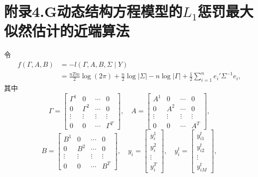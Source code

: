 \section*{附录4.G\quad 动态结构方程模型的\texorpdfstring{$L_1$}{L1}惩罚最大似然估计的近端算法}

令
\begin{equation}
\begin{aligned}
f(\Gamma,A,B)&=-l(\Gamma,A,B,\Sigma\mid Y)\\
&=\frac{nTm}{2}\log(2\pi)+\frac n2\log|\Sigma|-n\log|\Gamma|
+\frac12\sum_{i=1}^{n}e_i'\Sigma^{-1}e_i,
\end{aligned}\tag{4.G.1}
\end{equation}
其中
\[
\Gamma=\begin{bmatrix}\Gamma^1&0&\cdots&0\\0&\Gamma^2&\cdots&0\\\vdots&\vdots&\vdots&\vdots\\0&0&\cdots&\Gamma^T\end{bmatrix},\quad
A=\begin{bmatrix}A^1&0&\cdots&0\\0&A^2&\cdots&0\\\vdots&\vdots&\vdots&\vdots\\0&0&\cdots&A^T\end{bmatrix},
\]
\[
B=\begin{bmatrix}B^1&0&\cdots&0\\0&B^2&\cdots&0\\\vdots&\vdots&\vdots&\vdots\\0&0&\cdots&B^T\end{bmatrix},\quad
y_i=\begin{bmatrix}y_i^1\\y_i^2\\\vdots\\y_i^T\end{bmatrix},\quad
y_i^t=\begin{bmatrix}y_{i1}^t\\y_{i2}^t\\\vdots\\y_{iM}^t\end{bmatrix},
\]
